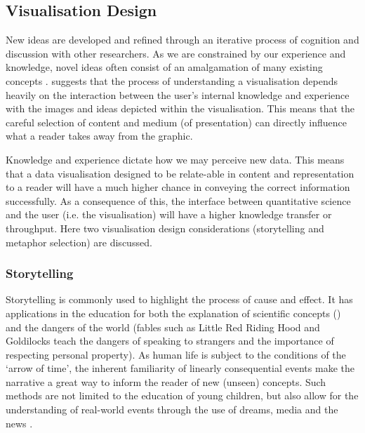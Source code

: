 \subsection{Visualisation Design}\label{sec:visdes}


New ideas are developed and refined through an iterative process of cognition and discussion with other researchers\citep{ch7}. 
As we are constrained by our experience and knowledge, novel ideas often consist of an amalgamation of many existing concepts \citep{wingedhorse,goodideas}. \citep{shapinginfo} suggests that the process of understanding a visualisation depends heavily on the interaction between the user's internal knowledge and experience with the images and ideas depicted within the visualisation. This means that the careful selection of content and medium (of presentation) can directly influence what a reader takes away from the graphic.

Knowledge and experience dictate how we may perceive new data. This means that a data visualisation designed to be relate-able in content and representation to a reader will have a much higher chance in conveying the correct information successfully. As a consequence of this, the interface between quantitative science and the user (i.e. the visualisation) will have a higher knowledge transfer or throughput. Here two visualisation design considerations (storytelling and metaphor selection) are discussed. 



\subsubsection{Storytelling}\label{sec:storytelling}

Storytelling is commonly used to highlight the process of cause and effect. It has applications in the education for both the explanation of scientific concepts (\citep{marsstory}) and the dangers of the world (fables such as Little Red Riding Hood and Goldilocks teach the dangers of speaking to strangers and the importance of respecting personal property). As human life is subject to the conditions of the `arrow of time', the inherent familiarity of linearly consequential events make the narrative a great way to inform the reader of new (unseen) concepts. Such methods are not limited to the education of young children, but also allow for the understanding of real-world events through the use of dreams, media and the news \citep{storyanimal,dream}. 


